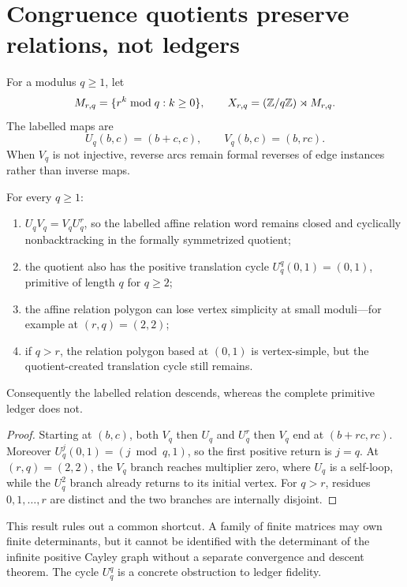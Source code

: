 \section{Congruence quotients preserve relations, not ledgers}
\label{sec:quotients}

For a modulus $q\ge1$, let
\[
M_{r,q}=\{r^k\bmod q:k\ge0\},\qquad
X_{r,q}=(\mathbb Z/q\mathbb Z)\rtimes M_{r,q}.
\]
The labelled maps are
\begin{equation}
U_q(b,c)=(b+c,c),\qquad V_q(b,c)=(b,rc).
\label{eq:quotient-actions}
\end{equation}
When $V_q$ is not injective, reverse arcs remain formal reverses of edge
instances rather than inverse maps.

\begin{theorem}
\label{thm:quotient}
For every $q\ge1$:
\begin{enumerate}
\item $U_qV_q=V_qU_q^r$, so the labelled affine relation word remains closed
and cyclically nonbacktracking in the formally symmetrized quotient;
\item the quotient also has the positive translation cycle
$U_q^q(0,1)=(0,1)$, primitive of length $q$ for $q\ge2$;
\item the affine relation polygon can lose vertex simplicity at small
moduli---for example at $(r,q)=(2,2)$;
\item if $q>r$, the relation polygon based at $(0,1)$ is vertex-simple, but
the quotient-created translation cycle still remains.
\end{enumerate}
Consequently the labelled relation descends, whereas the complete primitive
ledger does not.
\end{theorem}

\begin{proof}
Starting at $(b,c)$, both $V_q$ then $U_q$ and $U_q^r$ then $V_q$ end at
$(b+rc,rc)$.  Moreover $U_q^j(0,1)=(j\bmod q,1)$, so the first positive return
is $j=q$.  At $(r,q)=(2,2)$, the $V_q$ branch reaches multiplier zero, where
$U_q$ is a self-loop, while the $U_q^2$ branch already returns to its initial
vertex.  For $q>r$, residues $0,1,\ldots,r$ are distinct and the two branches
are internally disjoint.
\end{proof}

This result rules out a common shortcut.  A family of finite matrices may own
finite determinants, but it cannot be identified with the determinant of the
infinite positive Cayley graph without a separate convergence and descent
theorem.  The cycle $U_q^q$ is a concrete obstruction to ledger fidelity.
